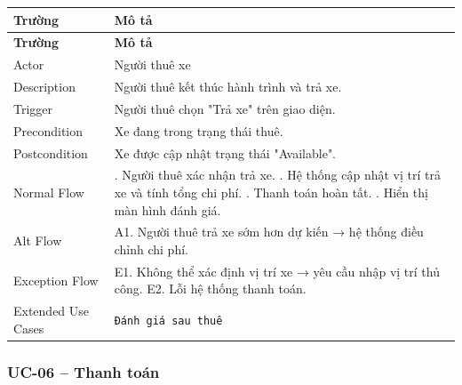 \begin{longtable}{|>{\raggedright\arraybackslash}p{4cm}|>{\raggedright\arraybackslash}p{11cm}|}
\hline
\textbf{Trường} & \textbf{Mô tả} \\
\hline
\endfirsthead

\hline
\textbf{Trường} & \textbf{Mô tả} \\
\hline
\endhead

\hline
\endfoot

Actor & Người thuê xe \\
\hline
Description & Người thuê kết thúc hành trình và trả xe. \\
\hline
Trigger & Người thuê chọn "Trả xe" trên giao diện. \\
\hline
Precondition & Xe đang trong trạng thái thuê. \\
\hline
Postcondition & Xe được cập nhật trạng thái "Available". \\
\hline
Normal Flow & 1. Người thuê xác nhận trả xe. \newline 2. Hệ thống cập nhật vị trí trả xe và tính tổng chi phí. \newline 3. Thanh toán hoàn tất. \newline 4. Hiển thị màn hình đánh giá. \\
\hline
Alt Flow & A1. Người thuê trả xe sớm hơn dự kiến → hệ thống điều chỉnh chi phí. \\
\hline
Exception Flow & E1. Không thể xác định vị trí xe → yêu cầu nhập vị trí thủ công. \newline E2. Lỗi hệ thống thanh toán. \\
\hline
Extended Use Cases & \texttt{Đánh giá sau thuê} \\
\hline
\end{longtable}

\subsubsection*{UC-06 – Thanh toán}

